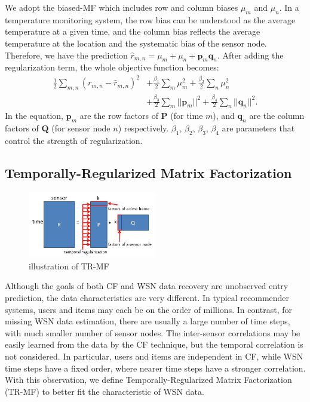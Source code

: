 We adopt the biased-MF which includes row and column biases $\mu_m$ and $\mu_n$. %
In a temperature monitoring system, the row bias can be understood as the average temperature at a given time, and the column bias reflects the average temperature at the location and the systematic bias of the sensor node.
Therefore, we have the prediction $\hat{r}_{m,n} = \mu_m + \mu_n + \mathbf{p}_m \mathbf{q}_n$.
After adding the regularization term, the whole objective function becomes:
\begin{equation*}\begin{aligned}
\frac{1}{2}\sum_{m,n}{(r_{m,n} - \hat{r}_{m,n})}^2 & + \frac{\beta_1}{2}\sum_m{\mu_m^2} + \frac{\beta_2}{2}\sum_n{\mu_n^2}\\
& + \frac{\beta_3}{2}\sum_m{||\mathbf{p}_m||^2} + \frac{\beta_4}{2}\sum_n{||\mathbf{q}_n||^2}.
\end{aligned}\end{equation*}
In the equation, $\mathbf{p}_m$ are the row factors of $\mathbf{P}$ (for time $m$), and $\mathbf{q}_n$ are the column factors of $\mathbf{Q}$ (for sensor node $n$) respectively.
$\beta_1$, $\beta_2$, $\beta_3$, $\beta_4$ are parameters that control the strength of regularization.

\subsection{Temporally-Regularized Matrix Factorization}

\begin{figure}[htbp]
	\centering
	\includegraphics[width=0.5\textwidth]{TRMF_illustration.png}
	\caption{illustration of TR-MF}
\end{figure}


Although the goals of both CF and WSN data recovery are unobserved entry prediction, the data characteristics are very different.
In typical recommender systems, users and items may each be on the order of millions.
In contrast, for missing WSN data estimation, there are usually a large number of time steps, with much smaller number of sensor nodes.
The inter-sensor correlations may be easily learned from the data by the CF technique, but the temporal correlation is not considered.
In particular, users and items are independent in CF, while WSN time steps have a fixed order, where nearer time steps have a stronger correlation.
With this observation, we define Temporally-Regularized Matrix Factorization (TR-MF) to better fit the characteristic of WSN data. 

